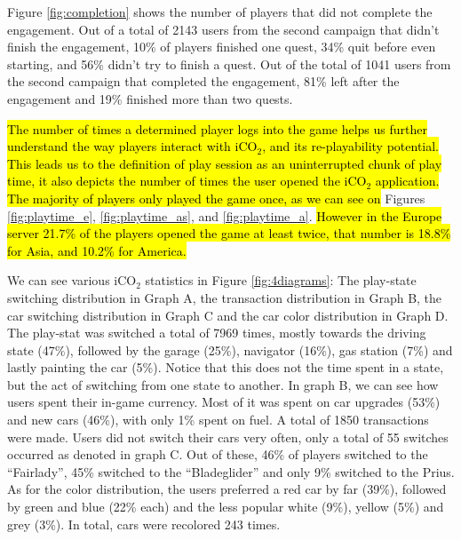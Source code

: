 \documentclass[preprint,authoryear,12pt]{elsarticle}
\newcommand{\hlc}[2][yellow]{ {\sethlcolor{#1} \hl{#2}} }
\begin{document}
Figure \ref{fig:completion} shows the number of players that did not complete the engagement. Out of a total of 2143 users from the second campaign that didn't finish the engagement, 10\% of players finished one quest, 34\% quit before even starting, and 56\% didn't try to finish a quest. Out of the total of 1041 users from the second campaign that completed the engagement, 81\% left after the engagement and 19\% finished more than two quests.


\hlc[green]
{The number of times a determined player logs into the game helps us further understand the way players interact with iCO$_2$, and its re-playability potential. This leads us to the definition of play session as an uninterrupted chunk of play time, it also depicts the number of times the user opened the iCO$_2$ application. The majority of players only played the game once, as we can see on }Figures \ref{fig:playtime_e}, \ref{fig:playtime_as}, and \ref{fig:playtime_a}.
\hlc[green]{However in the Europe server 21.7\% of the players opened the  game at least twice, that number is 18.8\% for Asia, and 10.2\% for America.}





We can see various iCO$_2$ statistics in Figure \ref{fig:4diagrams}: The play-state switching distribution in Graph A, the transaction distribution in Graph B, the car switching distribution in Graph C and the car color distribution in Graph D. The play-stat was switched a total of 7969 times, mostly towards the driving state (47\%), followed by the garage (25\%), navigator (16\%), gas station (7\%) and lastly painting the car (5\%). Notice that this does not the time spent in a state, but the act of switching from one state to another. In graph B, we can see how users spent their in-game currency. Most of it was spent on car upgrades (53\%) and new cars (46\%), with only 1\% spent on fuel. A total of 1850 transactions were made. Users did not switch their cars very often, only a total of 55 switches occurred as denoted in graph C. Out of these, 46\% of players switched to the ``Fairlady'', 45\% switched to the ``Bladeglider'' and only 9\% switched to the Prius. As for the color distribution, the users preferred a red car by far (39\%), followed by green and blue (22\% each) and the less popular white (9\%), yellow (5\%) and grey (3\%). In total, cars were recolored 243 times.
\end{document}

